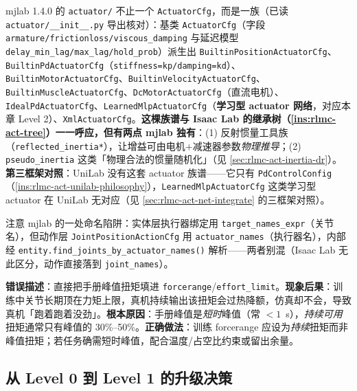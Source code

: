 \begin{insight}\label{ins:rlmc-act-mjlab-family}
mjlab 1.4.0 的 \verb|actuator/| 不止一个 \verb|ActuatorCfg|，而是一族（已读 \verb|actuator/__init__.py| 导出核对）：基类 \verb|ActuatorCfg|（字段 \verb|armature/frictionloss/viscous_damping| 与延迟模型 \verb|delay_min_lag/max_lag/hold_prob|）派生出 \verb|BuiltinPositionActuatorCfg|、\verb|BuiltinPdActuatorCfg|（\verb|stiffness=kp/damping=kd|）、\verb|BuiltinMotorActuatorCfg|、\verb|BuiltinVelocityActuatorCfg|、\verb|BuiltinMuscleActuatorCfg|、\verb|DcMotorActuatorCfg|（直流电机）、\verb|IdealPdActuatorCfg|、\verb|LearnedMlpActuatorCfg|（\textbf{学习型 actuator 网络}，对应本章 Level 2）、\verb|XmlActuatorCfg|。\textbf{这棵族谱与 Isaac Lab 的继承树（\cref{ins:rlmc-act-tree}）一一呼应，但有两点 mjlab 独有}：(1) 反射惯量工具族（\verb|reflected_inertia*|），让增益可由电机$+$减速器参数\emph{物理推导}；(2) \verb|pseudo_inertia| 这类「物理合法的惯量随机化」（见 \cref{sec:rlmc-act-inertia-dr}）。\textbf{第三框架对照}：UniLab 没有这套 actuator 族谱——它只有 \verb|PdControlConfig|（\cref{ins:rlmc-act-unilab-philosophy}），\verb|LearnedMlpActuatorCfg| 这类学习型 actuator 在 UniLab 无对应（见 \cref{sec:rlmc-act-net-integrate} 的三框架对照）。

注意 mjlab 的一处命名陷阱：实体层执行器绑定用 \verb|target_names_expr|（关节名），但动作层 \verb|JointPositionActionCfg| 用 \verb|actuator_names|（执行器名），内部经 \verb|entity.find_joints_by_actuator_names()| 解析——两者别混（Isaac Lab 无此区分，动作直接落到 \verb|joint_names|）。
\end{insight}

\begin{pitfall}
\textbf{错误描述}：直接把手册峰值扭矩填进 \verb|forcerange|/\verb|effort_limit|。\textbf{现象后果}：训练中关节长期顶在力矩上限，真机持续输出该扭矩会过热降额，仿真却不会，导致真机「跑着跑着没劲」。\textbf{根本原因}：手册峰值是\emph{短时}峰值（常 $<1$~s），\emph{持续可用}扭矩通常只有峰值的 30\%--50\%。\textbf{正确做法}：训练 forcerange 应设为\emph{持续}扭矩而非峰值扭矩；若任务确需短时峰值，配合温度/占空比约束或留出余量。
\end{pitfall}

\subsection{从 Level 0 到 Level 1 的升级决策}
\label{sec:rlmc-act-upgrade01}

